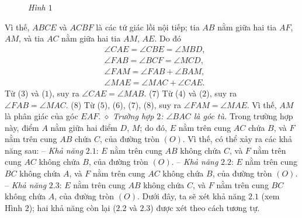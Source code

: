 \begin{multicols}{2}
\begin{figure}[H]
		\caption{\small\textit{\color{thachthuctoanhoc}Hình $1$}}
		\vspace*{-10pt}
	\end{figure}
	Vì thế, $ABCE$ và $ACBF$ là các tứ giác lồi nội tiếp; tia $AB$ nằm giữa hai tia $AF$, $AM$, và tia $AC$ nằm giữa hai tia $AM$, $AE$. Do đó
	\begin{align*}
		&\angle CAE = \angle CBE = \angle MBD, \tag{$3$}\\[-0.5ex]
		&\angle FAB = \angle BCF = \angle MCD, \tag{$4$}\\[-0.5ex]
		&\angle FAM = \angle FAB + \angle BAM,\tag{$5$}\\[-0.5ex]
		&\angle MAE = \angle MAC + \angle CAE.\tag{$6$}
	\end{align*}
	Từ ($3$) và ($1$), suy ra $\angle CAE = \angle MAB.$  \hfill ($7$)
	\vskip 0.05cm
	Từ ($4$) và ($2$), suy ra $\angle FAB = \angle MAC.$ \hfill ($8$)
	\vskip 0.05cm
	Từ ($5$), ($6$), ($7$), ($8$), suy ra $\angle FAM = \angle MAE$.  Vì thế, $AM$ là phân giác của góc $EAF$.
	\vskip 0.05cm
	$\diamond$ \textit{Trường hợp $2$: $\angle BAC$  là góc tù.}
	\vskip 0.05cm
	Trong trường hợp này, điểm $A$ nằm giữa hai điểm $D$, $M$; do đó, $E$ nằm trên cung $AC$ chứa $B$, và $F$ nằm trên cung $AB$ chứa $C$, của đường tròn $(O)$.
	\vskip 0.05cm
	Vì thế, có thể xảy ra các khả năng sau:
	\vskip 0.05cm
	-- \textit{Khả năng} $2.1$: $E$ nằm trên cung $AB$ không chứa $C$, và $F$ nằm trên cung $AC$ không chứa $B$, của đường tròn $(O)$.
	\vskip 0.05cm
	-- \textit{Khả năng} $2.2$: $E$ nằm trên cung $BC$ không chứa $A$, và $F$ nằm trên cung $AC$ không chứa $B$, của đường tròn $(O)$.
	\vskip 0.05cm
	-- \textit{Khả năng} $2.3$: $E$ nằm trên cung $AB$ không chứa $C$, và $F$ nằm trên cung $BC$ không chứa $A$, của đường tròn $(O)$.
	\vskip 0.05cm
	Dưới đây, ta sẽ xét khả năng $2.1$ (xem Hình $2$); hai khả năng còn lại ($2.2$ và $2.3$) được xét theo cách tương tự.
	\begin{figure}[H]
		\vspace*{-5pt}

\end{figure}
\end{multicols}
